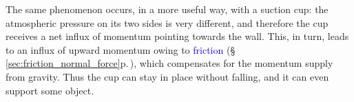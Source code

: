 \documentclass[a4paper,12pt,%
onecolumn,oneside,%
british%
]{memoir}
\renewcommand*{\|}[1][]{\nonscript\:#1\vert\nonscript\:\mathopen{}}
\newcommand*{\sect}{\S}%
\renewcommand*{\autoref}[3][\sect\,\ref]{\textcolor{blue}{#3} {\color{blue}\scriptsize(\faIcon[regular]{eye}\;#1{#2}\;p.\,\pageref{#2})}}
\begin{document}
%
%
The same phenomenon occurs, in a more useful way, with a suction cup:
the atmospheric pressure on its two sides is very different, and therefore the cup receives a net influx of momentum pointing towards the wall. This, in turn, leads to an influx of upward momentum owing to \autoref{sec:friction_normal_force}{friction}, which compensates for the momentum supply from gravity. Thus the cup can stay in place without falling, and it can even support some object.

\medskip
\end{document}

